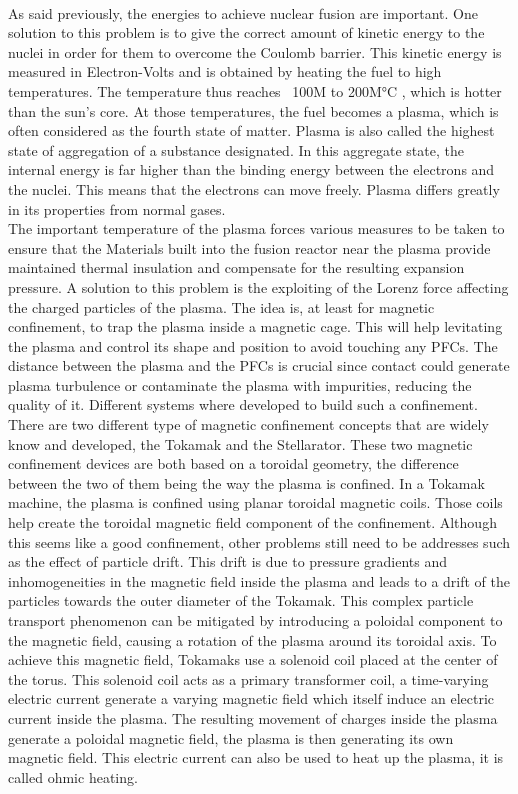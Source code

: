 \\
\normalsize{\indent As said previously, the energies to achieve nuclear fusion are important. One solution to this problem is to give the correct amount of kinetic energy to the nuclei in order for them to overcome the Coulomb barrier. This kinetic energy is measured in Electron-Volts and is obtained by heating the fuel to high temperatures. The temperature thus reaches ~100M to 200M°C \cite{diekmann_energie:_2014}, which is hotter than the sun’s core. At those temperatures, the fuel becomes a plasma, which is often considered as the fourth state of matter. Plasma is also called the highest state of aggregation of a substance designated. In this aggregate state, the internal energy is far higher than the binding energy between the electrons and the nuclei. This means that the electrons can move freely. Plasma differs greatly in its properties from normal gases.}
\\
\break
\normalsize{\indent The important temperature of the plasma forces various measures to be taken to ensure that the Materials built into the fusion reactor near the plasma provide maintained thermal insulation and compensate for the resulting expansion pressure. A solution to this problem is the exploiting of the Lorenz force affecting the charged particles of the plasma. The idea is, at least for magnetic confinement, to trap the plasma inside a magnetic cage. This will help levitating the plasma and control its shape and position to avoid touching any \acrshort{PFCs}. The distance between the plasma and the \acrshort{PFCs} is crucial since contact could generate plasma turbulence or contaminate the plasma with impurities, reducing the quality of it. Different systems where developed to build such a confinement. }
\\
\break
\normalsize{\indent There are two different type of magnetic confinement concepts that are widely know and developed, the Tokamak and the Stellarator. These two magnetic confinement devices are both based on a toroidal geometry, the difference between the two of them being the way the plasma is confined. In a Tokamak machine, the plasma is confined using planar toroidal magnetic coils. Those coils help create the toroidal magnetic field component of the confinement. Although this seems like a good confinement, other problems still need to be addresses such as the effect of particle drift. This drift is due to  pressure gradients and inhomogeneities in the magnetic field inside the plasma and leads to a drift of the particles towards the outer diameter of the Tokamak. This complex particle transport phenomenon can be mitigated by introducing a poloidal component to the magnetic field, causing a rotation of the plasma around its toroidal axis. To achieve this magnetic field, Tokamaks use a solenoid coil placed at the center of the torus. This solenoid coil acts as a primary transformer coil, a time-varying electric current generate a varying magnetic field which itself induce an electric current inside the plasma. The resulting movement of charges inside the plasma generate a poloidal magnetic field, the plasma is then generating its own magnetic field. This electric current can also be used to heat up the plasma, it is called ohmic heating.}
